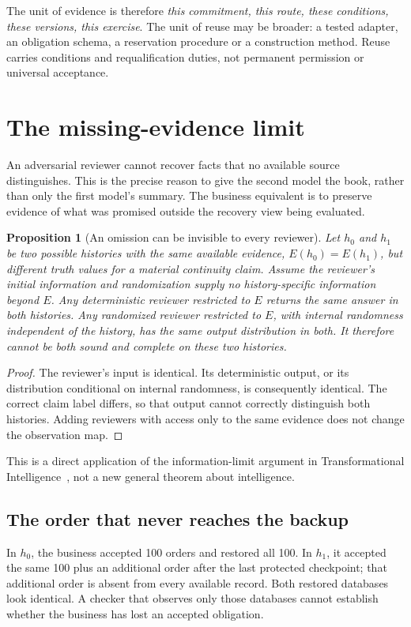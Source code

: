 \documentclass[11pt,a4paper]{article}
\newcommand{\ti}{Transformational Intelligence}
\newtheorem{proposition}{Proposition}
\newcommand{\chapterpage}{\clearpage}
\begin{document}
The unit of evidence is therefore \emph{this commitment, this route, these conditions, these versions, this exercise}. The unit of reuse may be broader: a tested adapter, an obligation schema, a reservation procedure or a construction method. Reuse carries conditions and requalification duties, not permanent permission or universal acceptance.

\chapterpage
\section{The missing-evidence limit}\label{sec:evidenceLimit}
An adversarial reviewer cannot recover facts that no available source distinguishes. This is the precise reason to give the second model the book, rather than only the first model's summary. The business equivalent is to preserve evidence of what was promised outside the recovery view being evaluated.

\begin{proposition}[An omission can be invisible to every reviewer]
Let $h_0$ and $h_1$ be two possible histories with the same available evidence, $E(h_0)=E(h_1)$, but different truth values for a material continuity claim. Assume the reviewer's initial information and randomization supply no history-specific information beyond $E$. Any deterministic reviewer restricted to $E$ returns the same answer in both histories. Any randomized reviewer restricted to $E$, with internal randomness independent of the history, has the same output distribution in both. It therefore cannot be both sound and complete on these two histories.
\end{proposition}
\begin{proof}
The reviewer's input is identical. Its deterministic output, or its distribution conditional on internal randomness, is consequently identical. The correct claim label differs, so that output cannot correctly distinguish both histories. Adding reviewers with access only to the same evidence does not change the observation map.\end{proof}
This is a direct application of the information-limit argument in \ti\ \cite[Theorem 3.1]{boucherTI}, not a new general theorem about intelligence.

\subsection{The order that never reaches the backup}
In $h_0$, the business accepted 100 orders and restored all 100. In $h_1$, it accepted the same 100 plus an additional order after the last protected checkpoint; that additional order is absent from every available record. Both restored databases look identical. A checker that observes only those databases cannot establish whether the business has lost an accepted obligation.
\end{document}

